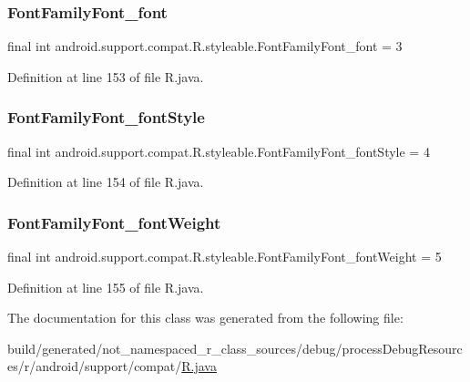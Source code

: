 \subsubsection{\texorpdfstring{FontFamilyFont\_font}{FontFamilyFont\_font}}
{\footnotesize\ttfamily final int android.\+support.\+compat.\+R.\+styleable.\+Font\+Family\+Font\+\_\+font = 3\hspace{0.3cm}{\ttfamily [static]}}



Definition at line 153 of file R.\+java.

\mbox{\label{classandroid_1_1support_1_1compat_1_1_r_1_1styleable_aad9bcc3dabdebc9e742a2c88c419bcd0}} 
\subsubsection{\texorpdfstring{FontFamilyFont\_fontStyle}{FontFamilyFont\_fontStyle}}
{\footnotesize\ttfamily final int android.\+support.\+compat.\+R.\+styleable.\+Font\+Family\+Font\+\_\+font\+Style = 4\hspace{0.3cm}{\ttfamily [static]}}



Definition at line 154 of file R.\+java.

\mbox{\label{classandroid_1_1support_1_1compat_1_1_r_1_1styleable_abe914cf7b1d07e59e4c8216fac03d2f8}} 
\subsubsection{\texorpdfstring{FontFamilyFont\_fontWeight}{FontFamilyFont\_fontWeight}}
{\footnotesize\ttfamily final int android.\+support.\+compat.\+R.\+styleable.\+Font\+Family\+Font\+\_\+font\+Weight = 5\hspace{0.3cm}{\ttfamily [static]}}



Definition at line 155 of file R.\+java.



The documentation for this class was generated from the following file\+:\begin{DoxyCompactItemize}
\item 
build/generated/not\+\_\+namespaced\+\_\+r\+\_\+class\+\_\+sources/debug/process\+Debug\+Resources/r/android/support/compat/\mbox{\hyperlink{android_2support_2compat_2_r_8java}{R.\+java}}\end{DoxyCompactItemize}
